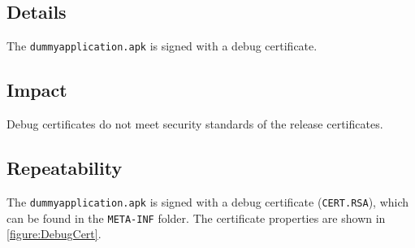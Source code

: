 %
%
%
%
\renewcommand{\FindingAuthor}{}
\renewcommand{\FindingName}{}
\renewcommand{\Location}{}
\renewcommand{\Component}{}
\renewcommand{\FoundWith}{}
\renewcommand{\TestMethod}{}
\renewcommand{\CVSS}{N/A}
\renewcommand{\CVSSvector}{N/A}
\renewcommand{\CWE}{296}
\renewcommand{\Criticality}{}
\renewcommand{\Exploitability}{]}
\renewcommand{\Category}{}
\renewcommand{\Detectability}{}


\ReportFindingHeader{\FindingName}



\subsection*{Details}

The \texttt{dummyapplication.apk} is signed with a debug certificate.


\subsection*{Impact}

Debug certificates do not meet security standards of the release certificates. 

\pagebreak
\subsection*{Repeatability}

The \texttt{dummyapplication.apk} is signed with a debug certificate (\texttt{CERT.RSA}), which can be found in the \texttt{META-INF} folder.
The certificate properties are shown in \cref{figure:DebugCert}.

